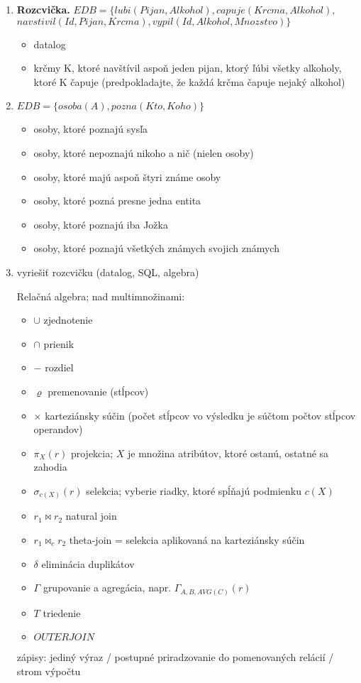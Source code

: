 \documentclass[10pt, a4paper]{article}
\begin{document}
\begin{enumerate}
\item {\bf Rozcvička.} $EDB=\{lubi(Pijan, Alkohol), capuje(Krcma, Alkohol),$\\
\hspace*{1cm} $navstivil(Id, Pijan, Krcma), vypil(Id, Alkohol, Mnozstvo)\}$
\begin{itemize}
    \item datalog
    \item krčmy K, ktoré navštívil aspoň jeden pijan, ktorý ľúbi všetky alkoholy, ktoré K čapuje (predpokladajte, že každá krčma čapuje nejaký alkohol) 
\end{itemize}

\item
$EDB = \{osoba(A), pozna(Kto, Koho)\}$
\begin{itemize}
    \item osoby, ktoré poznajú sysľa
    \item osoby, ktoré nepoznajú nikoho a nič (nielen osoby)
    \item osoby, ktoré majú aspoň štyri známe osoby
    \item osoby, ktoré pozná presne jedna entita
    \item osoby, ktoré poznajú iba Jožka
    \item osoby, ktoré poznajú všetkých známych svojich známych
\end{itemize}

\item vyriešiť rozcvičku (datalog, SQL, algebra)

Relačná algebra; nad multimnožinami:
\begin{itemize}
\item $\cup$ zjednotenie
\item $\cap$ prienik
\item $-$ rozdiel
\item $\varrho$ premenovanie (stĺpcov)
\item $\times$ karteziánsky súčin (počet stĺpcov vo výsledku je súčtom počtov stĺpcov operandov)
\item $\pi_X(r)$ projekcia; $X$ je množina atribútov, ktoré ostanú, ostatné sa zahodia
\item $\sigma_{c(X)}(r)$ selekcia; vyberie riadky, ktoré spĺňajú podmienku $c(X)$
\item $r_1 \bowtie r_2$ natural join
\item $r_1 \bowtie_c r_2$ theta-join = selekcia aplikovaná na karteziánsky súčin
\item $\delta$ eliminácia duplikátov
\item $\Gamma$ grupovanie a agregácia, napr. $\Gamma_{A, B, AVG(C)}(r)$
\item $T$ triedenie
\item $OUTERJOIN$
\end{itemize}
zápisy: jediný výraz / postupné priradzovanie do pomenovaných relácií / strom výpočtu
\end{enumerate}
\end{document}
